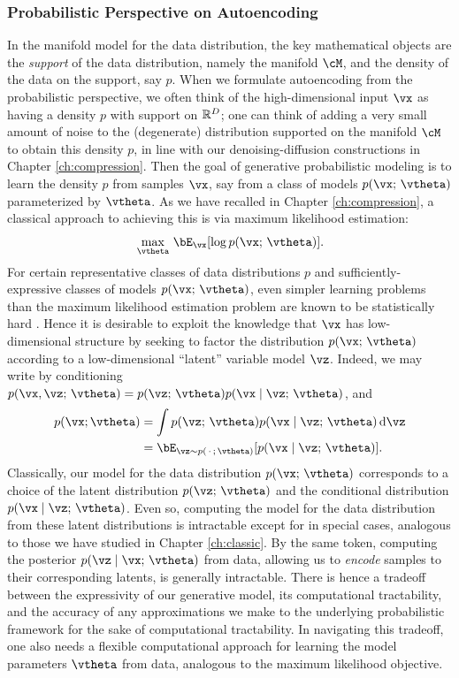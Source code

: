 \documentclass[../../book-main.tex]{subfiles}
\begin{document}
\subsubsection{Probabilistic Perspective on Autoencoding}
In the manifold model for the data distribution, the key mathematical objects
are the \textit{support} of the data distribution, namely the manifold $\cM$,
and the density of the data on the support, say $p$. When we formulate
autoencoding from the probabilistic perspective, we often think of the
high-dimensional input $\vx$ as having a density $p$ with support on $\mathbb{R}^D$; one
can think of adding a very small amount of noise to the (degenerate)
distribution supported on the manifold $\cM$ to obtain this density $p$, in line
with our denoising-diffusion constructions in Chapter \ref{ch:compression}.
Then the goal of generative probabilistic modeling is to learn the density $p$
from samples $\vx$, say from a class of models $p(\vx;\, \vtheta)$ parameterized
by $\vtheta$. As we have recalled in Chapter \ref{ch:compression}, a classical
approach to achieving this is via maximum likelihood estimation:
\begin{equation*}\label{eq:VAE-MLE}
\max_{\vtheta}\, \bE_{\vx}[ \log p(\vx;\, \vtheta) ].
\end{equation*}
For certain representative classes of data distributions $p$ %
and sufficiently-expressive classes of models $p(\vx;\, \vtheta)$, even simpler
learning problems than the maximum likelihood estimation problem are known to be
statistically hard \cite{Yang1999-wb}. Hence it is desirable to exploit the
knowledge that $\vx$ has low-dimensional structure by seeking to factor the
distribution $p(\vx ;\, \vtheta)$ according to a low-dimensional ``latent''
variable model $\vz$. Indeed, we may write by conditioning $p(\vx,
\vz ;\, \vtheta)
= p(\vz;\, \vtheta) p(\vx \mid \vz;\, \vtheta)$, and
\begin{align*}
p(\vx; \vtheta) &= \int p(\vz;\, \vtheta) p(\vx \mid \vz;\, \vtheta) \odif \vz
\\
&=
\bE_{\vz \sim p(\,\cdot\,;\, \vtheta)}[ p(\vx \mid \vz;\, \vtheta) ].
\end{align*}
Classically, our model for the data distribution $p(\vx;\, \vtheta)$ corresponds
to a choice of the latent distribution $p(\vz;\, \vtheta)$ and the conditional
distribution $p(\vx \mid \vz;\, \vtheta)$.
Even so, computing the model for the data distribution from these latent
distributions is intractable except for in special cases, analogous to those we
have studied in Chapter \ref{ch:classic}.
By the same token, computing the posterior $p(\vz \mid \vx;\, \vtheta)$ from
data, allowing us to \textit{encode} samples to their corresponding latents, is
generally intractable.
There is hence a tradeoff between the expressivity of our generative model,
its computational tractability, and the accuracy of any approximations we make
to the underlying probabilistic framework for the sake of
computational tractability.
In navigating this tradeoff, one also needs a flexible computational approach
for learning the model parameters $\vtheta$ from data, analogous to the maximum
likelihood objective.
\end{document}
